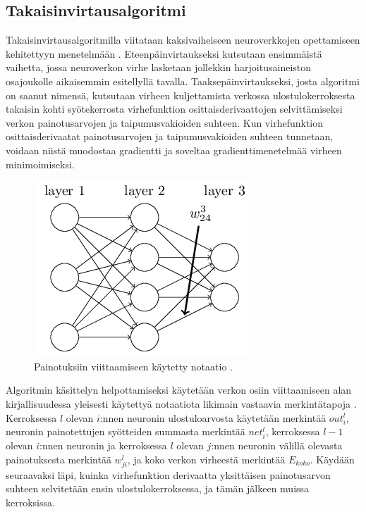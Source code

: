 \documentclass[finnish]{tktltiki2}
\theoremstyle{definition}
\theoremstyle{remark}
\begin{document}


  \subsection{Takaisinvirtausalgoritmi}
    Takaisinvirtausalgoritmilla viitataan kaksivaiheiseen neuroverkkojen opettamiseen kehitettyyn menetelmään \cite{Rumelhart-1986-back-prop}. Eteenpäinvirtaukseksi kutsutaan ensimmäistä vaihetta, jossa neuroverkon virhe lasketaan jollekkin harjoitusaineiston osajoukolle aikaisemmin esitellyllä tavalla. Taaksepäinvirtaukseksi, josta algoritmi on saanut nimensä, kutsutaan virheen kuljettamista verkossa ulostulokerroksesta takaisin kohti syötekerrosta virhefunktion osittaisderivaattojen selvittämiseksi verkon painotusarvojen ja taipumusvakioiden suhteen. Kun virhefunktion osittaisderivaatat painotusarvojen ja taipumusvakioiden suhteen tunnetaan, voidaan niistä muodostaa gradientti ja soveltaa gradienttimenetelmää virheen minimoimiseksi.

    \begin{figure}[h]
      \centering
      \includegraphics[scale=0.4]{neuron-notation}
      \caption{Painotuksiin viittaamiseen käytetty notaatio \cite{Nielsen-neural}.}
      \label{pic:neuron-notation}
    \end{figure}

    Algoritmin käsittelyn helpottamiseksi käytetään verkon osiin viittaamiseen alan kirjallisuudessa yleisesti käytettyä notaatiota likimain vastaavia merkintätapoja \cite{Nielsen-neural}\cite{Rojas96}. Kerroksessa $l$ olevan $i$:nnen neuronin ulostuloarvosta käytetään merkintää $out_i^l$, neuronin painotettujen syötteiden summasta merkintää $net_i^l$, kerroksessa $l-1$ olevan $i$:nnen neuronin ja kerroksessa $l$ olevan $j$:nnen neuronin välillä olevasta painotuksesta merkintää $w_{ji}^l$, ja koko verkon virheestä merkintää $E_{koko}$. Käydään seuraavaksi läpi, kuinka virhefunktion derivaatta yksittäisen painotusarvon suhteen selvitetään ensin ulostulokerroksessa, ja tämän jälkeen muissa kerroksissa.
\end{document}
